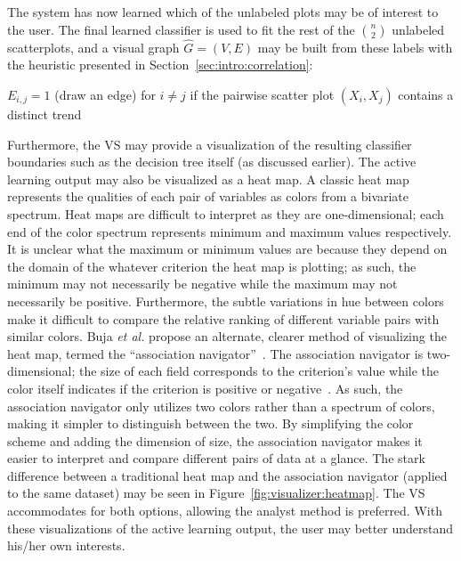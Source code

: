 The system has now learned which of the unlabeled plots 
may be of interest to the user. The final learned classifier is used to fit the 
rest of the $n \choose 2$ unlabeled scatterplots, and a visual graph 
$\hat{G}=(V,E)$ 
may be built from these labels with the heuristic presented in 
Section~\ref{sec:intro:correlation}:

\begin{algorithm}
	$E_{i,j} = 1$ (draw an edge) for $i\neq j$ if the pairwise scatter plot 
	$(X_i,X_j)$ contains a distinct trend
\end{algorithm}

Furthermore, the VS may provide a visualization of the resulting classifier 
boundaries such as the decision tree itself (as discussed earlier). The active 
learning output may also be visualized as a heat map. A 
classic heat map represents the qualities of each pair of variables as colors 
from a bivariate spectrum. Heat maps are difficult to interpret as they are 
one-dimensional; each end of the color spectrum represents minimum and maximum 
values respectively. It is unclear what the maximum or minimum values are 
because they depend on the domain of the whatever criterion the heat map is 
plotting; as such, the minimum may not necessarily be negative while the 
maximum may not necessarily be positive. Furthermore, the subtle variations in 
hue between colors make it difficult to compare the relative ranking of 
different variable pairs with similar colors. Buja \textit{et al.} 
propose an alternate, clearer method of visualizing the heat map, termed the 
``association navigator''~\cite{buja2016}. The association navigator is 
two-dimensional; the size of each field corresponds to the criterion's value 
while the color itself indicates if the criterion is positive or 
negative~\cite{buja2016}. As such, the 
association navigator only utilizes two colors rather than a spectrum of 
colors, making it simpler to distinguish between the two. By simplifying the 
color scheme and adding the dimension of size, the association navigator makes 
it easier to interpret and compare different pairs of data at a glance. 
The stark difference between a traditional heat map and the association 
navigator (applied to the same dataset) may be seen in 
Figure~\ref{fig:visualizer:heatmap}. The VS accommodates for both options, 
allowing the analyst method is preferred. 
With these visualizations of the active learning output, the user may better 
understand his/her own interests. 

